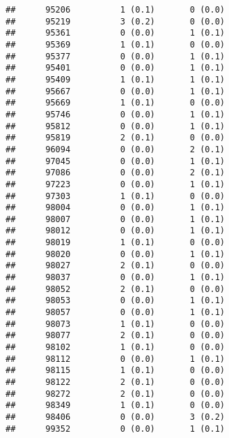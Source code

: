 \documentclass[]{article}
\begin{document}
\begin{verbatim}
##      95206          1 (0.1)       0 (0.0)                        
##      95219          3 (0.2)       0 (0.0)                        
##      95361          0 (0.0)       1 (0.1)                        
##      95369          1 (0.1)       0 (0.0)                        
##      95377          0 (0.0)       1 (0.1)                        
##      95401          0 (0.0)       1 (0.1)                        
##      95409          1 (0.1)       1 (0.1)                        
##      95667          0 (0.0)       1 (0.1)                        
##      95669          1 (0.1)       0 (0.0)                        
##      95746          0 (0.0)       1 (0.1)                        
##      95812          0 (0.0)       1 (0.1)                        
##      95819          2 (0.1)       0 (0.0)                        
##      96094          0 (0.0)       2 (0.1)                        
##      97045          0 (0.0)       1 (0.1)                        
##      97086          0 (0.0)       2 (0.1)                        
##      97223          0 (0.0)       1 (0.1)                        
##      97303          1 (0.1)       0 (0.0)                        
##      98004          0 (0.0)       1 (0.1)                        
##      98007          0 (0.0)       1 (0.1)                        
##      98012          0 (0.0)       1 (0.1)                        
##      98019          1 (0.1)       0 (0.0)                        
##      98020          0 (0.0)       1 (0.1)                        
##      98027          2 (0.1)       0 (0.0)                        
##      98037          0 (0.0)       1 (0.1)                        
##      98052          2 (0.1)       0 (0.0)                        
##      98053          0 (0.0)       1 (0.1)                        
##      98057          0 (0.0)       1 (0.1)                        
##      98073          1 (0.1)       0 (0.0)                        
##      98077          2 (0.1)       0 (0.0)                        
##      98102          1 (0.1)       0 (0.0)                        
##      98112          0 (0.0)       1 (0.1)                        
##      98115          1 (0.1)       0 (0.0)                        
##      98122          2 (0.1)       0 (0.0)                        
##      98272          2 (0.1)       0 (0.0)                        
##      98349          1 (0.1)       0 (0.0)                        
##      98406          0 (0.0)       3 (0.2)                        
##      99352          0 (0.0)       1 (0.1)
\end{verbatim}
\end{document}
